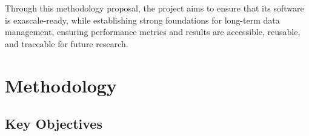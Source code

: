Through this methodology proposal, the \exama project aims to ensure that its software is exascale-ready, while establishing strong foundations for long-term data management, ensuring performance metrics and results are accessible, reusable, and traceable for future research.




\section{Methodology}
\label{sec:bench:methodology}


\subsection{Key Objectives}
\label{sec:key-objectives}

